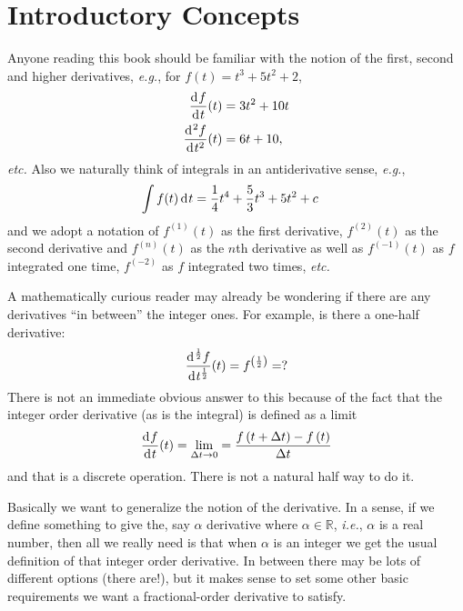 \section{Introductory Concepts}

Anyone reading this book should be familiar with the notion of the first, second
and higher derivatives, \textit{e.g.}, for $f(t) = t^3 + 5 t^2 + 2$, 
\begin{align}
  \frac{\operatorname{d}\hspace*{-1pt} f}{\operatorname{d}\hspace*{-1pt} t}(t) &= 3 t^2 + 10 t \\
  \frac{\operatorname{d}\hspace*{-1pt}^2 f}{\operatorname{d}\hspace*{-1pt} t^2}(t) &= 6t + 10, 
  \label{eq:derivs}
\end{align}
\textit{etc.} Also we naturally think of integrals in an antiderivative sense,
\textit{e.g.},
\begin{align}
  \int f(t) \operatorname{d}\hspace*{-1pt} t &= \frac{1}{4} t^4 + \frac{5}{3} t^3 + 5 t^2 + c 
  \label{eq:integrals}
\end{align}
and we adopt a notation of $f^{(1)}(t)$ as the first derivative, $f^{(2)}(t)$ as
the second derivative and $f^{(n)}(t)$ as the $n$th derivative as well as
$f^{(-1)}(t)$ as $f$ integrated one time, $f^{(-2)}$ as $f$ integrated two
times, \textit{etc.}

A mathematically curious reader may already be wondering if there are any
derivatives ``in between'' the integer ones.  For example, is there a one-half
derivative:
\begin{equation}
  \frac{\operatorname{d}\hspace*{-1pt}^\frac{1}{2} f}{\operatorname{d}\hspace*{-1pt} t^\frac{1}{2}}(t) = f^{\left(\frac{1}{2}\right)} = ?
  \label{eq:halfderiv}
\end{equation}
There is not an immediate obvious answer to this because of the fact that the
integer order derivative (as is the integral) is defined as a limit
\begin{equation}
  \frac{\operatorname{d}\hspace*{-1pt} f}{\operatorname{d}\hspace*{-1pt} t}(t) = \lim_{\Delta t \rightarrow 0} = \frac{f\left(t + \Delta t \right) - f\left(t\right)}{\Delta t}
  \label{eq:limdef}
\end{equation}
and that is a discrete operation. There is not a natural half way to do it.

Basically we want to generalize the notion of the derivative. In a sense, if we
define something to give the, say $\alpha$ derivative where $\alpha \in \mathbb
R$, \textit{i.e.}, $\alpha$ is a real number, then all we really need is that
when $\alpha$ is an integer we get the usual definition of that integer order
derivative. In between there may be lots of different options (there are!), but
it makes sense to set some other basic requirements we want a fractional-order
derivative to satisfy.

